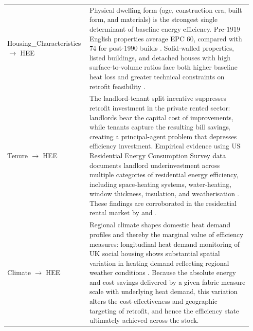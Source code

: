 \begin{longtable}{@{}p{3.5cm}p{11.5cm}@{}}
\addlinespace
Housing\_Characteristics $\to$ HEE & Physical dwelling form (age, construction era, built form, and materials) is the strongest single determinant of baseline energy efficiency. Pre-1919 English properties average EPC 60, compared with 74 for post-1990 builds \citep{office_for_national_statistics_energy_2025}. Solid-walled properties, listed buildings, and detached houses with high surface-to-volume ratios face both higher baseline heat loss and greater technical constraints on retrofit feasibility \citep{trotta_factors_2018, symonds_linking_2024}. \\
\addlinespace
Tenure $\to$ HEE & The landlord-tenant split incentive suppresses retrofit investment in the private rented sector: landlords bear the capital cost of improvements, while tenants capture the resulting bill savings, creating a principal-agent problem that depresses efficiency investment. Empirical evidence using US Residential Energy Consumption Survey data documents landlord underinvestment across multiple categories of residential energy efficiency, including space-heating systems, water-heating, window thickness, insulation, and weatherisation \citep{melvin_split_2018}. These findings are corroborated in the residential rental market by \citet{petrov_landlord-tenant_2021} and \citet{gillingham_split_2012}. \\
\addlinespace
Climate $\to$ HEE & Regional climate shapes domestic heat demand profiles and thereby the marginal value of efficiency measures: longitudinal heat demand monitoring of UK social housing shows substantial spatial variation in heating demand reflecting regional weather conditions \citep{aragon_influence_2022}. Because the absolute energy and cost savings delivered by a given fabric measure scale with underlying heat demand, this variation alters the cost-effectiveness and geographic targeting of retrofit, and hence the efficiency state ultimately achieved across the stock. \\
\end{longtable}


